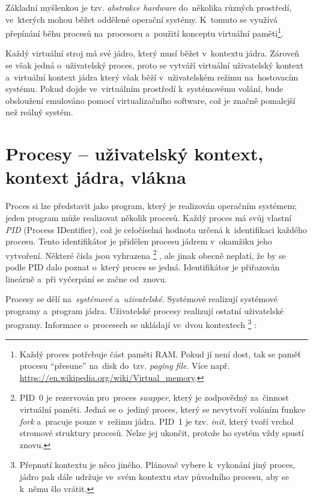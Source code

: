 Základní myšlenkou je tzv. \emph{abstrakce hardware} do~několika různých prostředí, ve~kterých mohou běžet oddělené operační systémy. K~tomuto se využívá přepínání běhu procesů na~procesoru a~použití konceptu virtuální paměti\footnote{Každý proces potřebuje část paměti RAM. Pokud jí není dost, tak se paměť procesu \enquote{přesune} na~disk do~tzv. \emph{paging file}. Více např. \url{https://en.wikipedia.org/wiki/Virtual_memory}.}.

Každý virtuální stroj má své jádro, který musí běžet v~kontextu jádra. Zároveň se však jedná o~uživatelský proces, proto se vytváří virtuální uživatelský kontext a~virtuální kontext jádra který však běží v~uživatelském režimu na~hostovacím systému. Pokud dojde ve~virtuálním prostředí k~systémovému volání, bude obsloužení emulováno pomocí virtualizačního software, což je značně pomalejší než reálný systém.


\clearpage
\section{Procesy -- uživatelský kontext, kontext jádra, vlákna}
\label{procesy}

Proces si lze představit jako program, který je realizován operačním systémem; jeden program může realizovat několik procesů. Každý proces má svůj vlastní \emph{PID} (Process IDentifier), což je celočíselná hodnota určená k~identifikaci každého procesu. Tento identifikátor je přidělen procesu jádrem v~okamžiku jeho vytvoření. Některé čísla jsou vyhrazena%
\footnote{PID~0 je rezervován pro~proces \emph{swapper}, který je zodpovědný za~činnost virtuální paměti. Jedná se o~jediný proces, který se nevytvoří voláním funkce \emph{fork} a~pracuje pouze v~režimu jádra. PID~1 je tzv. \emph{init}, který tvoří vrchol stromové struktury procesů. Nelze jej ukončit, protože ho systém vždy spustí znovu.}%
, ale jinak obecně neplatí, že by se podle PID dalo poznat o~který proces se jedná. Identifikátor je přiřazován lineárně a~při vyčerpání se začne od~znovu.

Procesy se dělí na~\emph{systémové} a~\emph{uživatelské}. Systémové realizují systémové programy a~program jádra. Uživatelské procesy realizují ostatní uživatelské programy. Informace o~procesech se ukládají ve~dvou kontextech%
\footnote{Přepnutí kontextu je něco jiného. Plánovač vybere k~vykonání jiný proces, jádro pak dále udržuje ve~svém kontextu stav původního procesu, aby se k~němu šlo vrátit.}%
:

